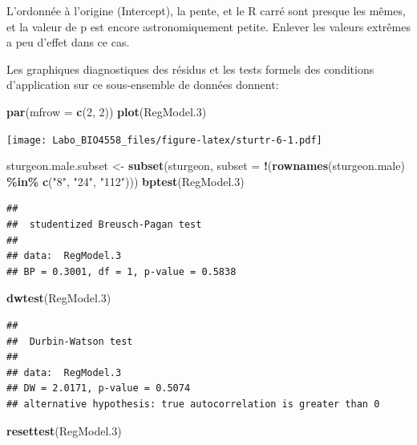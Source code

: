\documentclass[
  12pt,
]{book}
\newenvironment{Shaded}{\begin{snugshade}}{\end{snugshade}}
\newcommand{\DataTypeTok}[1]{\textcolor[rgb]{0.13,0.29,0.53}{#1}}
\newcommand{\DecValTok}[1]{\textcolor[rgb]{0.00,0.00,0.81}{#1}}
\newcommand{\FloatTok}[1]{\textcolor[rgb]{0.00,0.00,0.81}{#1}}
\newcommand{\KeywordTok}[1]{\textcolor[rgb]{0.13,0.29,0.53}{\textbf{#1}}}
\newcommand{\NormalTok}[1]{#1}
\newcommand{\OperatorTok}[1]{\textcolor[rgb]{0.81,0.36,0.00}{\textbf{#1}}}
\newcommand{\StringTok}[1]{\textcolor[rgb]{0.31,0.60,0.02}{#1}}
\begin{document}
L'ordonnée à l'origine (Intercept), la pente, et le R carré sont presque les mêmes, et la valeur de p est encore astronomiquement petite. Enlever les valeurs extrêmes a peu d'effet dans ce cas.

Les graphiques diagnostiques des résidus et les tests formels des conditions d'application sur ce sous-ensemble de données donnent:

\begin{Shaded}
\begin{Highlighting}[]
\KeywordTok{par}\NormalTok{(}\DataTypeTok{mfrow =} \KeywordTok{c}\NormalTok{(}\DecValTok{2}\NormalTok{, }\DecValTok{2}\NormalTok{))}
\KeywordTok{plot}\NormalTok{(RegModel}\FloatTok{.3}\NormalTok{)}
\end{Highlighting}
\end{Shaded}

\texttt{[image: Labo\_BIO4558\_files/figure-latex/sturtr-6-1.pdf]}

\begin{Shaded}
\begin{Highlighting}[]
\NormalTok{sturgeon.male.subset \textless{}{-}}\StringTok{ }\KeywordTok{subset}\NormalTok{(sturgeon, }\DataTypeTok{subset =} \OperatorTok{!}\NormalTok{(}\KeywordTok{rownames}\NormalTok{(sturgeon.male) }\OperatorTok{\%in\%}\StringTok{ }\KeywordTok{c}\NormalTok{(}\StringTok{"8"}\NormalTok{, }\StringTok{"24"}\NormalTok{, }\StringTok{"112"}\NormalTok{)))}
\KeywordTok{bptest}\NormalTok{(RegModel}\FloatTok{.3}\NormalTok{)}
\end{Highlighting}
\end{Shaded}

\begin{verbatim}
## 
##  studentized Breusch-Pagan test
## 
## data:  RegModel.3
## BP = 0.3001, df = 1, p-value = 0.5838
\end{verbatim}

\begin{Shaded}
\begin{Highlighting}[]
\KeywordTok{dwtest}\NormalTok{(RegModel}\FloatTok{.3}\NormalTok{)}
\end{Highlighting}
\end{Shaded}

\begin{verbatim}
## 
##  Durbin-Watson test
## 
## data:  RegModel.3
## DW = 2.0171, p-value = 0.5074
## alternative hypothesis: true autocorrelation is greater than 0
\end{verbatim}

\begin{Shaded}
\begin{Highlighting}[]
\KeywordTok{resettest}\NormalTok{(RegModel}\FloatTok{.3}\NormalTok{)}
\end{Highlighting}
\end{Shaded}
\end{document}
